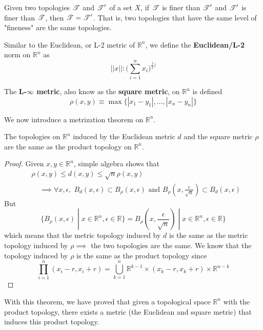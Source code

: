   \begin{corollary}
  Given two topologies $\operatorname{\mathscr{T}}$ and $\operatorname{\mathscr{T}}^\prime$ of a set $X$, if $\operatorname{\mathscr{T}}$ is finer than $\operatorname{\mathscr{T}}^\prime$ and $\operatorname{\mathscr{T}}^\prime$ is finer than $\operatorname{\mathscr{T}}$, then $\operatorname{\mathscr{T}} = \operatorname{\mathscr{T}}^\prime$. That is, two topologies that have the same level of "fineness" are the same topologies. 
  \end{corollary}

  \begin{definition}
  Similar to the Euclidean, or L-2 metric of $\mathbb{R}^n$, we define the \textbf{Euclidean/L-2} norm on $\mathbb{R}^n$ as
  \[||x||: \bigg( \sum_{i=1}^n x_i \bigg)^{\frac{1}{2})}\]
  \end{definition}

  \begin{definition}
  The \textbf{L-$\infty$ metric}, also know as the \textbf{square metric}, on $\mathbb{R}^n$ is defined 
  \[\rho(x, y) \equiv \max{\{|x_1 - y_1|, ..., |x_n - y_n|\}}\]
  \end{definition}

  We now introduce a metrization theorem on $\mathbb{R}^n$. 

  \begin{theorem}
  The topologies on $\mathbb{R}^n$ induced by the Euclidean metric $d$ and the square metric $\rho$ are the same as the product topology on $\mathbb{R}^n$. 
  \end{theorem}
  \begin{proof}
  Given $x, y \in \mathbb{R}^n$, simple algebra shows that 
  \begin{align*}
      & \rho(x, y) \leq d(x, y) \leq \sqrt{n} \rho(x, y) \\
      & \;\;\;\; \implies \forall x, \epsilon, \; B_d (x, \epsilon) \subset B_\rho (x, \epsilon) \text{ and } B_\rho (x, \frac{\epsilon}{\sqrt{n}}) \subset B_d (x, \epsilon)
  \end{align*}
  But
  \[\{ B_\rho (x, \epsilon) \; | \; x \in \mathbb{R}^n, \epsilon \in \mathbb{R}\} = B_\rho (x, \frac{\epsilon}{\sqrt{n}}) \; | \; x \in \mathbb{R}^n, \epsilon \in \mathbb{R}\}\]
  which means that the metric topology induced by $d$ is the same as the metric topology induced by $\rho \implies$ the two topologies are the same. We know that the topology induced by $\rho$ is the same as the product topology since 
  \[\prod_{i=1}^n (x_i - r, x_i + r) = \bigcup_{k=1}^n \mathbb{R}^{k-1} \times (x_k - r, x_k + r) \times \mathbb{R}^{n-k}\]
  \end{proof}
  With this theorem, we have proved that given a topological space $\mathbb{R}^n$ with the product topology, there exists a metric (the Euclidean and square metric) that induces this product topology. 

